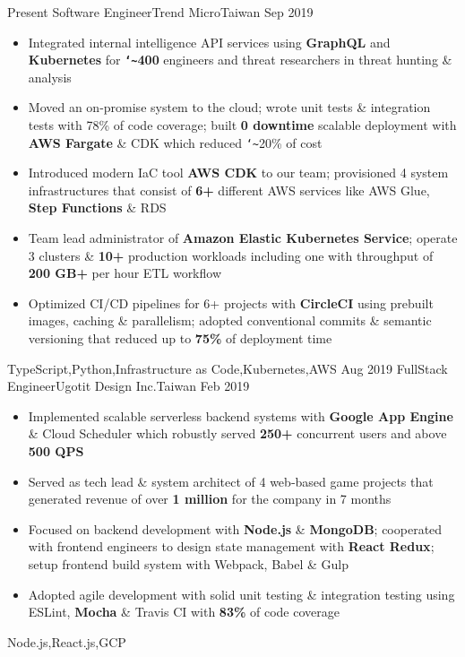 \begin{experiences}
  \experience
    {Present}       {Software Engineer}{Trend Micro}{Taiwan}
    {Sep 2019}      {
                      \begin{itemize}
                        \item{Integrated internal intelligence API services using \textbf{GraphQL} and \textbf{Kubernetes} for \textbf{\texttt{\char`\~}400} engineers and threat researchers in threat hunting \& analysis}
                        \item{Moved an on-promise system to the cloud; wrote unit tests \& integration tests with 78\% of code coverage; built \textbf{0 downtime} scalable deployment with \textbf{AWS Fargate} \& CDK which reduced \texttt{\char`\~}20\% of cost}
                        \item{Introduced modern IaC tool \textbf{AWS CDK} to our team; provisioned 4 system infrastructures that consist of \textbf{6+} different AWS services like AWS Glue, \textbf{Step Functions} \& RDS}
                        \item{Team lead administrator of \textbf{Amazon Elastic Kubernetes Service}; operate 3 clusters \& \textbf{10+} production workloads including one with throughput of \textbf{200 GB+} per hour ETL workflow}
                        \item{Optimized CI/CD pipelines for 6+ projects with \textbf{CircleCI} using prebuilt images, caching \& parallelism; adopted conventional commits \& semantic versioning that reduced up to \textbf{75\%} of deployment time}
                      \end{itemize}
                    }
                    {TypeScript,Python,Infrastructure as Code,Kubernetes,AWS}
  \emptySeparator
  \experience
    {Aug 2019}      {FullStack Engineer}{Ugotit Design Inc.}{Taiwan}
    {Feb 2019}      {
                      \begin{itemize}
                        \item{Implemented scalable serverless backend systems with \textbf{Google App Engine} \& Cloud Scheduler which robustly served \textbf{250+} concurrent users and above \textbf{500 QPS}}
                        \item{Served as tech lead \& system architect of 4 web‐based game projects that generated revenue of over \textbf{1 million} for the company in 7 months}
                        \item{Focused on backend development with \textbf{Node.js} \& \textbf{MongoDB}; cooperated with frontend engineers to design state management with \textbf{React Redux}; setup frontend build system with Webpack, Babel \& Gulp}
                        \item{Adopted agile development with solid unit testing \& integration testing using ESLint, \textbf{Mocha} \& Travis CI with \textbf{83\%} of code coverage}
                      \end{itemize}
                    }
                    {Node.js,React.js,GCP}
\end{experiences}
